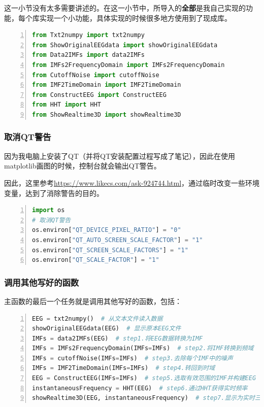 \documentclass[cs4size,a4paper]{ctexart}
\numberwithin{equation}{section}
\numberwithin{table}{section}
\numberwithin{figure}{section}
\begin{document}
这一小节没有太多需要讲述的。在这一小节中，所导入的\textbf{全部}是我自己实现的功能，每个库实现一个小功能，具体实现的时候很多地方使用到了现成库。

\begin{lstlisting}[language={python},
    numbers=left,
    numberstyle=\tiny\monaco,
    basicstyle=\footnotesize\monaco]
from Txt2numpy import txt2numpy
from ShowOriginalEEGdata import showOriginalEEGdata
from Data2IMFs import data2IMFs
from IMFs2FrequencyDomain import IMFs2FrequencyDomain
from CutoffNoise import cutoffNoise
from IMF2TimeDomain import IMF2TimeDomain
from ConstructEEG import ConstructEEG
from HHT import HHT
from ShowRealtime3D import showRealtime3D
\end{lstlisting}

\subsubsection{取消QT警告}

因为我电脑上安装了QT（并将QT安装配置过程写成了笔记），因此在使用\colorbox{LetMeFlyGray}{matplotlib}画图的时候，控制台就会输出QT警告。

因此，这里参考\url{https://www.likecs.com/ask-924744.html}，通过临时改变一些环境变量，达到了消除警告的目的。

\begin{lstlisting}[language={python},
numbers=left,
numberstyle=\tiny\monaco,
basicstyle=\footnotesize\monaco]
import os
# 取消QT警告
os.environ["QT_DEVICE_PIXEL_RATIO"] = "0"
os.environ["QT_AUTO_SCREEN_SCALE_FACTOR"] = "1"
os.environ["QT_SCREEN_SCALE_FACTORS"] = "1"
os.environ["QT_SCALE_FACTOR"] = "1"
\end{lstlisting}

\subsubsection{调用其他写好的函数}

主函数的最后一个任务就是调用其他写好的函数，包括：

\begin{lstlisting}[language={python},
numbers=left,
numberstyle=\tiny\monaco,
basicstyle=\footnotesize\monaco]
EEG = txt2numpy()  # 从文本文件读入数据
showOriginalEEGdata(EEG)  # 显示原本EEG文件
IMFs = data2IMFs(EEG)  # step1.将EEG数据转换为IMF
IMFs = IMFs2FrequencyDomain(IMFs=IMFs)  # step2.将IMF转换到频域
IMFs = cutoffNoise(IMFs=IMFs)  # step3.去除每个IMF中的噪声
IMFs = IMF2TimeDomain(IMFs=IMFs)  # step4.转回到时域
EEG = ConstructEEG(IMFs=IMFs)  # step5.选取有效范围的IMF并构建EEG
instantaneousFrequency = HHT(EEG)  # step6.通过HHT获得实时频率
showRealtime3D(EEG, instantaneousFrequency)  # step7.显示为实时三维图
\end{lstlisting}
\end{document}
